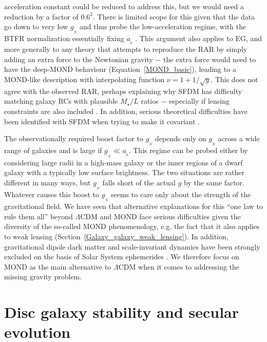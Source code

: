 \documentclass[fleqn,usenatbib,useAMS,onecolumn]{mnras} %
\begin{document}
acceleration constant could be reduced to address this, but we would need a reduction by a factor of $0.6^2$. There is limited scope for this given that the data go down to very low $g_{_N}$ and thus probe the low-acceleration regime, with the BTFR normalization essentially fixing $a_{_0}$ \citep[e.g.][]{Lelli_2019}. This argument also applies to EG, and more generally to any theory that attempts to reproduce the RAR by simply adding an extra force to the Newtonian gravity $-$ the extra force would need to have the deep-MOND behaviour (Equation~\ref{MOND_basic}), leading to a MOND-like description with interpolating function $\nu = 1 + 1/\sqrt{y}$. This does not agree with the observed RAR, perhaps explaining why SFDM has difficulty matching galaxy RCs with plausible $M_{\star}/L$ ratios $-$ especially if lensing constraints are also included \citep*{Mistele_2022}. In addition, serious theoretical difficulties have been identified with SFDM when trying to make it covariant \citep{Hertzberg_2021}.

The observationally required boost factor to $g_{_N}$ depends only on $g_{_N}$ across a wide range of galaxies and is large if $g_{_N} \ll a_{_0}$. This regime can be probed either by considering large radii in a high-mass galaxy or the inner regions of a dwarf galaxy with a typically low surface brightness. The two situations are rather different in many ways, but $g_{_N}$ falls short of the actual $g$ by the same factor. Whatever causes this boost to $g_{_N}$ seems to care only about the strength of the gravitational field. We have seen that alternative explanations for this ``one law to rule them all'' \citep{Lelli_2017} beyond $\Lambda$CDM and MOND face serious difficulties given the diversity of the so-called MOND phenomenology, e.g. the fact that it also applies to weak lensing (Section~\ref{Galaxy_galaxy_weak_lensing}). In addition, gravitational dipole dark matter \citep{Hajdukovic_2020} and scale-invariant dynamics \citep{Maeder_2020} have been strongly excluded on the basis of Solar System ephemerides \citep{Banik_2020_dipole, Banik_2020_SID}. We therefore focus on MOND as the main alternative to $\Lambda$CDM when it comes to addressing the missing gravity problem.





\section{Disc galaxy stability and secular evolution}
\label{Disc_galaxy_stability_evolution}
\end{document}
